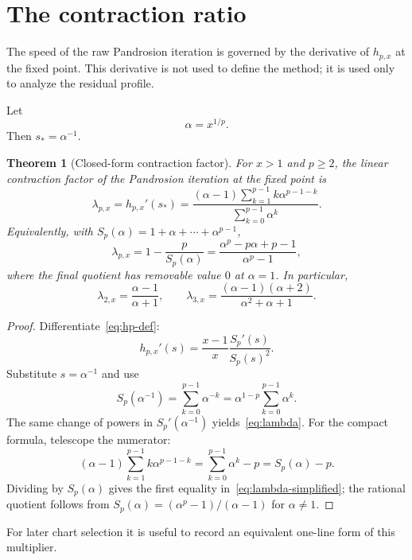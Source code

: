 \documentclass[10pt,a4paper]{article}
\theoremstyle{plain}
\newtheorem{theorem}{Theorem}[section]
\theoremstyle{definition}
\theoremstyle{remark}
\newcommand{\Sp}{S_p}
\newcommand{\hp}{h_{p,x}}
\begin{document}
\section{The contraction ratio}
\label{sec:lambda}

The speed of the raw Pandrosion iteration is governed by the derivative of
$\hp$ at the fixed point.  This derivative is not used to define the method; it
is used only to analyze the residual profile.

Let
\[
  \alpha=x^{1/p}.
\]
Then $s_*=\alpha^{-1}$.

\begin{theorem}[Closed-form contraction factor]
\label{thm:lambda}
For $x>1$ and $p\ge2$, the linear contraction factor of the Pandrosion
iteration at the fixed point is
\begin{equation}
  \lambda_{p,x}=\hp'(s_*)
  =\frac{(\alpha-1)\sum_{k=1}^{p-1}k\alpha^{p-1-k}}
         {\sum_{k=0}^{p-1}\alpha^k}.
  \label{eq:lambda}
\end{equation}
Equivalently, with $S_p(\alpha)=1+\alpha+\cdots+\alpha^{p-1}$,
\begin{equation}
  \lambda_{p,x}
  =1-\frac{p}{S_p(\alpha)}
  =\frac{\alpha^p-p\alpha+p-1}{\alpha^p-1},
  \label{eq:lambda-simplified}
\end{equation}
where the final quotient has removable value $0$ at $\alpha=1$.  In particular,
\[
  \lambda_{2,x}=\frac{\alpha-1}{\alpha+1},
  \qquad
  \lambda_{3,x}=\frac{(\alpha-1)(\alpha+2)}{\alpha^2+\alpha+1}.
\]
\end{theorem}

\begin{proof}
Differentiate~\eqref{eq:hp-def}:
\[
  \hp'(s)=\frac{x-1}{x}\frac{\Sp'(s)}{\Sp(s)^2}.
\]
Substitute $s=\alpha^{-1}$ and use
\[
  \Sp(\alpha^{-1})
  =\sum_{k=0}^{p-1}\alpha^{-k}
  =\alpha^{1-p}\sum_{k=0}^{p-1}\alpha^k.
\]
The same change of powers in $\Sp'(\alpha^{-1})$ yields~\eqref{eq:lambda}.
For the compact formula, telescope the numerator:
\[
  (\alpha-1)\sum_{k=1}^{p-1}k\alpha^{p-1-k}
  =\sum_{k=0}^{p-1}\alpha^k-p
  =S_p(\alpha)-p.
\]
Dividing by $S_p(\alpha)$ gives the first equality in~\eqref{eq:lambda-simplified};
the rational quotient follows from
$S_p(\alpha)=(\alpha^p-1)/(\alpha-1)$ for $\alpha\ne1$.
\end{proof}




For later chart selection it is useful to record an equivalent one-line form of
this multiplier.
\end{document}
